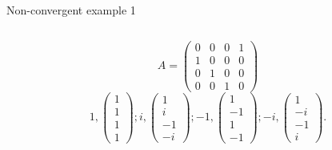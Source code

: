 \documentclass[10pt]{beamer}
\begin{document}
\begin{frame}{Non-convergent example 1}
\begin{columns}
\begin{column}{0.6\textwidth}
\begin{center}
      \end{center}
      \[
        A =
        \begin{pmatrix}
          0 & 0 & 0 & 1\\
          1 & 0 & 0 & 0\\
          0 & 1 & 0 & 0\\
          0 & 0 & 1 & 0
        \end{pmatrix}
      \]
      \[
        1,
        \begin{pmatrix}1\\1\\1\\1
        \end{pmatrix};
        i,
        \begin{pmatrix}1\\i\\-1\\-i
        \end{pmatrix};
        -1,
        \begin{pmatrix}1\\-1\\1\\-1
        \end{pmatrix};
        -i,
        \begin{pmatrix}1\\-i\\-1\\i
        \end{pmatrix}.
      \]
    \end{column}
  \end{columns}
\end{frame}
\end{document}
